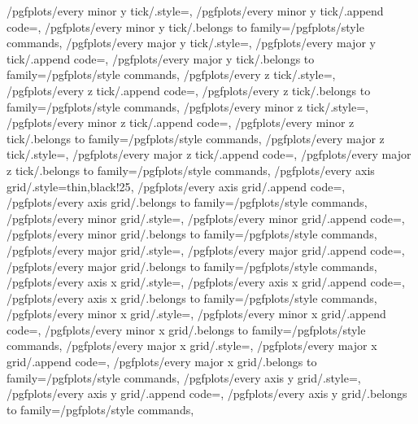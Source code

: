 {	/pgfplots/every minor y tick/.style={},
	/pgfplots/every minor y tick/.append code={},
	/pgfplots/every minor y tick/.belongs to family=/pgfplots/style commands,
	/pgfplots/every major y tick/.style={},
	/pgfplots/every major y tick/.append code={},
	/pgfplots/every major y tick/.belongs to family=/pgfplots/style commands,
	/pgfplots/every z tick/.style={},
	/pgfplots/every z tick/.append code={},
	/pgfplots/every z tick/.belongs to family=/pgfplots/style commands,
	/pgfplots/every minor z tick/.style={},
	/pgfplots/every minor z tick/.append code={},
	/pgfplots/every minor z tick/.belongs to family=/pgfplots/style commands,
	/pgfplots/every major z tick/.style={},
	/pgfplots/every major z tick/.append code={},
	/pgfplots/every major z tick/.belongs to family=/pgfplots/style commands,
	/pgfplots/every axis grid/.style={thin,black!25},
	/pgfplots/every axis grid/.append code={},
	/pgfplots/every axis grid/.belongs to family=/pgfplots/style commands,
	/pgfplots/every minor grid/.style={},
	/pgfplots/every minor grid/.append code={},
	/pgfplots/every minor grid/.belongs to family=/pgfplots/style commands,
	/pgfplots/every major grid/.style={},
	/pgfplots/every major grid/.append code={},
	/pgfplots/every major grid/.belongs to family=/pgfplots/style commands,
	/pgfplots/every axis x grid/.style={},
	/pgfplots/every axis x grid/.append code={},
	/pgfplots/every axis x grid/.belongs to family=/pgfplots/style commands,
	/pgfplots/every minor x grid/.style={},
	/pgfplots/every minor x grid/.append code={},
	/pgfplots/every minor x grid/.belongs to family=/pgfplots/style commands,
	/pgfplots/every major x grid/.style={},
	/pgfplots/every major x grid/.append code={},
	/pgfplots/every major x grid/.belongs to family=/pgfplots/style commands,
	/pgfplots/every axis y grid/.style={},
	/pgfplots/every axis y grid/.append code={},
	/pgfplots/every axis y grid/.belongs to family=/pgfplots/style commands,
}
